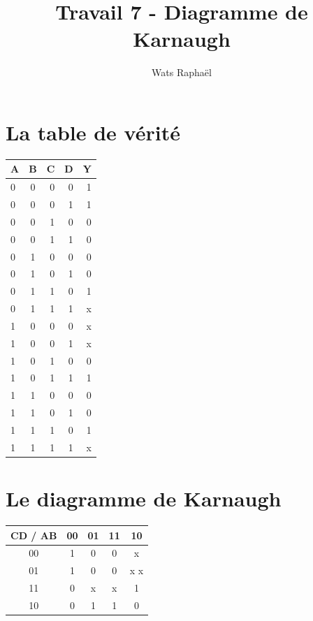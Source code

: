 \documentclass{homeworg}
\title{Travail 7 - Diagramme de Karnaugh}
\author{Wats Raphaël}
\begin{document}
\maketitle

\section{La table de vérité}
\begin{center}
    \LARGE
    \begin{tabular}{|l|c|r|r|r|}
        \hline
            A & B & C & D & Y\\
        \hline
            0 & 0 & 0 & 0 & 1\\
            0 & 0 & 0 & 1 & 1\\
            0 & 0 & 1 & 0 & 0\\
            0 & 0 & 1 & 1 & 0\\
            0 & 1 & 0 & 0 & 0\\
            0 & 1 & 0 & 1 & 0\\
            0 & 1 & 1 & 0 & 1\\
            0 & 1 & 1 & 1 & x\\
            1 & 0 & 0 & 0 & x\\
            1 & 0 & 0 & 1 & x\\
            1 & 0 & 1 & 0 & 0\\
            1 & 0 & 1 & 1 & 1\\
            1 & 1 & 0 & 0 & 0\\
            1 & 1 & 0 & 1 & 0\\
            1 & 1 & 1 & 0 & 1\\
            1 & 1 & 1 & 1 & x\\
        \hline
    \end{tabular}
\end{center}
\newpage

\section{Le diagramme de Karnaugh}
\begin{center}
    \Huge
    \begin{tabular}{|c|c|c|c|c|}
        \hline
        CD / AB & 00 & 01 & 11 & 10\\
        \hline
        00 & \color{red} 1 & 0 & 0 & \color{red} x\\
        01 & \color{red} 1 & 0 & 0 & \color{red} x \color{green} x\\
        11 & 0 & \color{blue} x & \color{blue} x & \color{green} 1\\
        10 & 0 & \color{blue} 1 & \color{blue} 1 & 0\\
        \hline
    \end{tabular}
\end{center}
\end{document}
